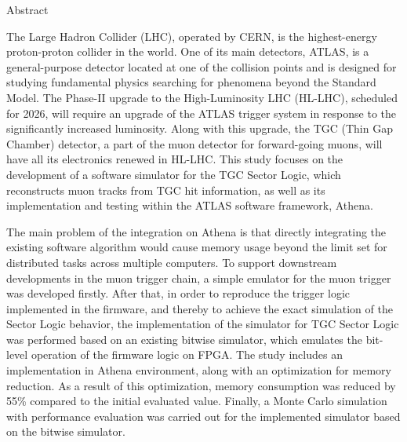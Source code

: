 \begin{abstractpage}{Abstract}



    The Large Hadron Collider (LHC), operated by CERN, is the highest-energy proton-proton collider in the world. One of its main detectors, ATLAS, is a general-purpose detector located at one of the collision points and is designed for studying fundamental physics searching for phenomena beyond the Standard Model. The Phase-II upgrade to the High-Luminosity LHC (HL-LHC), scheduled for 2026, will require an upgrade of the ATLAS trigger system in response to the significantly increased luminosity. Along with this upgrade, the TGC (Thin Gap Chamber) detector, a part of the muon detector for forward-going muons, will have all its electronics renewed in HL-LHC. This study focuses on the development of a software simulator for the TGC Sector Logic, which reconstructs muon tracks from TGC hit information, as well as its implementation and testing within the ATLAS software framework, Athena.

    The main problem of the integration on Athena is that directly integrating the existing software algorithm would cause memory usage beyond the limit set for distributed tasks across multiple computers. To support downstream developments in the muon trigger chain, a simple emulator for the muon trigger was developed firstly. After that, in order to reproduce the trigger logic implemented in the firmware, and thereby to achieve the exact simulation of the Sector Logic behavior, the implementation of the simulator for TGC Sector Logic was performed based on an existing bitwise simulator, which emulates the bit-level operation of the firmware logic on FPGA. The study includes an implementation in Athena environment, along with an optimization for memory reduction. As a result of this optimization, memory consumption was reduced by 55\% compared to the initial evaluated value. Finally, a Monte Carlo simulation with performance evaluation was carried out for the implemented simulator based on the bitwise simulator.

\end{abstractpage}
